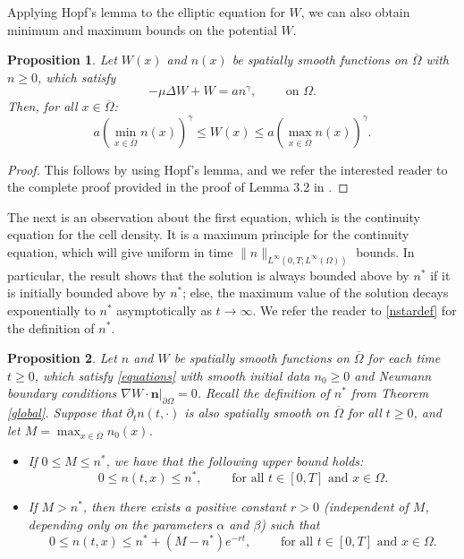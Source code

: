 \documentclass[12pt]{article}
\newcommand{\bd}{\boldsymbol}
\theoremstyle{plain}
\newtheorem{proposition}{Proposition}[section]
\begin{document}
Applying Hopf's lemma to the elliptic equation for $W$, we can also obtain minimum and maximum bounds on the potential $W$. 

\begin{proposition}\label{Wbound}
Let $W(x)$ and $n(x)$ be spatially smooth functions on $\overline{\Omega}$ with $n \ge 0$, which satisfy
\begin{equation*}
-\mu \Delta W + W = an^{\gamma}, \qquad \text{ on } \Omega.
\end{equation*}
Then, for all $x \in \overline{\Omega}$:
\begin{equation*}
a\left(\min_{x \in \overline{\Omega}} n(x)\right)^{\gamma} \le W(x) \le a\left(\max_{x \in \overline{\Omega}} n(x)\right)^{\gamma}.
\end{equation*}
\end{proposition}

\begin{proof}
    This follows by using Hopf's lemma, and we refer the interested reader to the complete proof provided in the proof of Lemma 3.2 in \cite{WeberTrivisa}.
\end{proof}

The next is an observation about the first equation, which is the continuity equation for the cell density. It is a maximum principle for the continuity equation, which will give uniform in time $\|n\|_{L^{\infty}(0, T; L^{\infty}(\Omega))}$ bounds. In particular, the result shows that the solution is always bounded above by $n^{*}$ if it is initially bounded above by $n^{*}$; else, the maximum value of the solution decays exponentially to $n^{*}$ asymptotically as $t \to \infty$. We refer the reader to \eqref{nstardef} for the definition of $n^{*}$.

\begin{proposition}\label{maxprinciple}
    Let $n$ and $W$ be spatially smooth functions on $\overline{\Omega}$ for each time $t \ge 0$, which satisfy \eqref{equations} with smooth initial data $n_{0} \ge 0$ and Neumann boundary conditions $\nabla W \cdot \bd{n}|_{\partial \Omega} = 0$. Recall the definition of $n^{*}$ from Theorem \ref{global}. Suppose that $\partial_{t}n(t, \cdot)$ is also spatially smooth on $\overline{\Omega}$ for all $t \ge 0$, and let $M = \max_{x \in \overline{\Omega}} n_{0}(x)$.
    \begin{itemize}
        \item If $0 \le M \le n^{*}$, we have that the following upper bound holds: 
    \begin{equation*}
        0 \le n(t, x) \le n^{*}, \qquad \text{ for all $t \in [0, T]$ and $x \in \Omega$}.
    \end{equation*}
    \item If $M > n^{*}$, then there exists a positive constant $r > 0$ (independent of $M$, depending only on the parameters $\alpha$ and $\beta$) such that
    \begin{equation*}
    0 \le n(t, x) \le n^{*} + (M - n^{*}) e^{-rt}, \qquad \text{ for all $t \in [0, T]$ and $x \in \Omega$.}
    \end{equation*}
    \end{itemize}
\end{proposition}  
\end{document}

